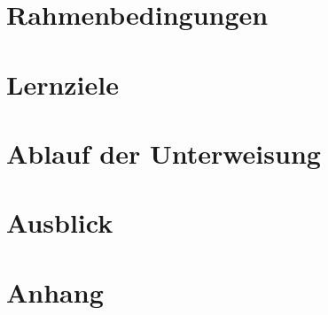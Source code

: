\documentclass[12pt, a4paper, oneside, titlepage]{article}
\begin{document}
\section{Rahmenbedingungen} \label{kapRahmenbedingungen}


\pagebreak

\section{Lernziele} \label{kapLernziele}

\section{Ablauf der Unterweisung} \label{kapAblaufUnterweisung}



\section{Ausblick} \label{kapAusblick}

\pagebreak
\section{Anhang}
\begin{appendix}
\end{appendix}
\end{document}
